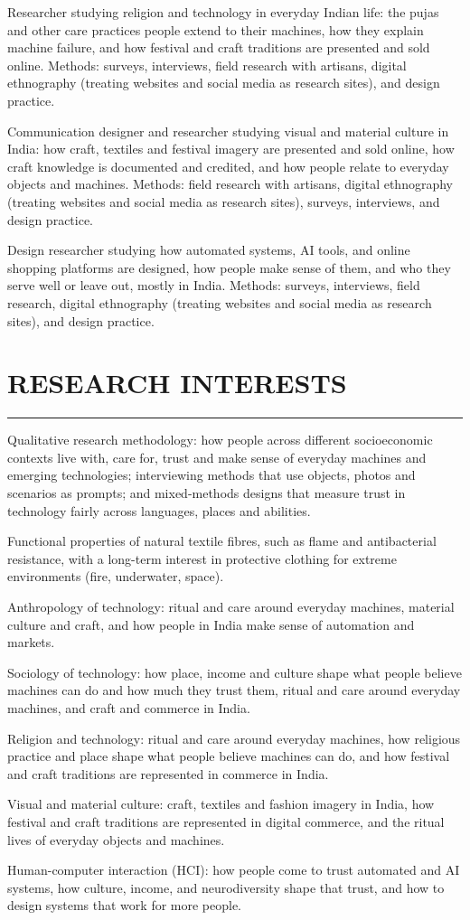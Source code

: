 \documentclass[10pt,letterpaper]{article}
\newcommand{\sectionrule}{\par\vspace{-2pt}\noindent\rule{\linewidth}{0.4pt}\par\vspace{2pt}}
\newcommand{\body}[1]{{\setlength{\rightskip}{2.7em}#1\par}}
\newenvironment{spread}[2][\normalsize]{\par\begingroup\linespread{#2}#1\selectfont}{\par\endgroup}
\begin{document}
\begin{spread}{1.07}
\body{Researcher studying religion and technology in everyday Indian life: the pujas and other care practices people extend to their machines, how they explain machine failure, and how festival and craft traditions are presented and sold online. Methods: surveys, interviews, field research with artisans, digital ethnography (treating websites and social media as research sites), and design practice.}
\else\ifdefined\ARTHIST
\body{Communication designer and researcher studying visual and material culture in India: how craft, textiles and festival imagery are presented and sold online, how craft knowledge is documented and credited, and how people relate to everyday objects and machines. Methods: field research with artisans, digital ethnography (treating websites and social media as research sites), surveys, interviews, and design practice.}
\else
\body{Design researcher studying how automated systems, AI tools, and online shopping platforms are designed, how people make sense of them, and who they serve well or leave out, mostly in India. Methods: surveys, interviews, field research, digital ethnography (treating websites and social media as research sites), and design practice.}
\fi\fi\fi\fi\fi\fi

\section{\MakeUppercase{Research Interests}}
\sectionrule
\ifdefined\EDRES
\body{Qualitative research methodology: how people across different socioeconomic contexts live with, care for, trust and make sense of everyday machines and emerging technologies; interviewing methods that use objects, photos and scenarios as prompts; and mixed-methods designs that measure trust in technology fairly across languages, places and abilities.}
\else\ifdefined\TEXTILE
\body{Functional properties of natural textile fibres, such as flame and antibacterial resistance, with a long-term interest in protective clothing for extreme environments (fire, underwater, space).}
\else\ifdefined\ANTHRO
\body{Anthropology of technology: ritual and care around everyday machines, material culture and craft, and how people in India make sense of automation and markets.}
\else\ifdefined\SOCSCI
\body{Sociology of technology: how place, income and culture shape what people believe machines can do and how much they trust them, ritual and care around everyday machines, and craft and commerce in India.}
\else\ifdefined\RELIG
\body{Religion and technology: ritual and care around everyday machines, how religious practice and place shape what people believe machines can do, and how festival and craft traditions are represented in commerce in India.}
\else\ifdefined\ARTHIST
\body{Visual and material culture: craft, textiles and fashion imagery in India, how festival and craft traditions are represented in digital commerce, and the ritual lives of everyday objects and machines.}
\else
\body{Human-computer interaction (HCI): how people come to trust automated and AI systems, how culture, income, and neurodiversity shape that trust, and how to design systems that work for more people.}
\fi\fi\fi\fi\fi\fi


\end{spread}
\end{document}
